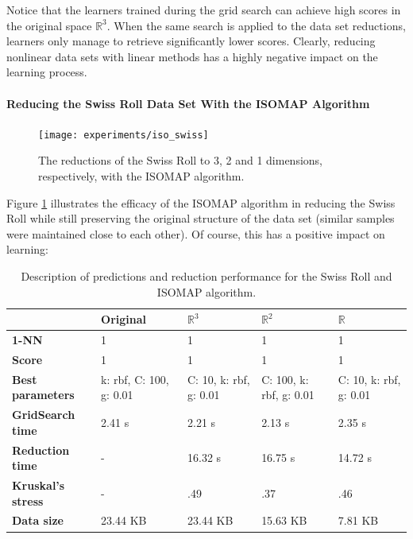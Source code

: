 Notice that the learners trained during the grid search can achieve high scores in the original space $\mathbb{R}^3$. When the same search is applied to the data set reductions, learners only manage to retrieve significantly lower scores. Clearly, reducing nonlinear data sets with linear methods has a highly negative impact on the learning process.

\paragraph{Reducing the Swiss Roll Data Set With the ISOMAP Algorithm}

\begin{figure}[H]
	\centering
	\captionsetup{justification=centering}
	\texttt{[image: experiments/iso\_swiss]}
	\caption{The reductions of the Swiss Roll to 3, 2 and 1 dimensions, respectively, with the ISOMAP algorithm.}
	\label{fig:dsswissiso}
\end{figure}

Figure \ref{fig:dsswissiso} illustrates the efficacy of the ISOMAP algorithm in reducing the Swiss Roll while still preserving the original structure of the data set (similar samples were maintained close to each other). Of course, this has a positive impact on learning:

\begin{table}[H]
	\centering
	
	\begin{tabular}{|p{.20\linewidth}|p{.15\linewidth}|p{.15\linewidth}|p{.15\linewidth}|p{.15\linewidth}|}
		\hline
		& \textbf{Original} & $\mathbb{R}^3$ & $\mathbb{R}^2$ & $\mathbb{R}$ \\\hline
		\textbf{1-NN} & 1 & 1 & 1 & 1 \\\hline
		\textbf{Score} & 1 & 1 & 1 & 1 \\\hline
		\textbf{Best parameters} & k: rbf, C: 100, g: 0.01 & C: 10, k: rbf, g: 0.01 & C: 100, k: rbf, g: 0.01 & C: 10, k: rbf, g: 0.01 \\\hline
		\textbf{GridSearch time} & 2.41 s & 2.21 s & 2.13 s & 2.35 s \\\hline
		\textbf{Reduction time} & - & 16.32 s & 16.75 s & 14.72 s\\\hline
		\textbf{Kruskal's stress} & - & .49 & .37 & .46 \\\hline
		\textbf{Data size} & 23.44 KB & 23.44 KB & 15.63 KB & 7.81 KB \\\hline
	\end{tabular}
	\captionsetup{justification=centering}
	\caption{Description of predictions and reduction performance for the Swiss Roll and ISOMAP algorithm.}
\end{table}

